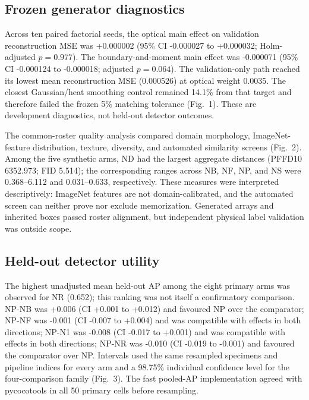 \subsection{Frozen generator diagnostics}
Across ten paired factorial seeds, the optical main effect on validation reconstruction MSE was +0.000002 (95\% CI -0.000027 to +0.000032; Holm-adjusted $p=0.977$). The boundary-and-moment main effect was -0.000071 (95\% CI -0.000124 to -0.000018; adjusted $p=0.064$). The validation-only path reached its lowest mean reconstruction MSE (0.000526) at optical weight 0.0035. The closest Gaussian/heat smoothing control remained 14.1\% from that target and therefore failed the frozen 5\% matching tolerance (Fig.~1). These are development diagnostics, not held-out detector outcomes.

The common-roster quality analysis compared domain morphology, ImageNet-feature distribution, texture, diversity, and automated similarity screens (Fig.~2). Among the five synthetic arms, ND had the largest aggregate distances (PFFD10 6352.973; FID 5.514); the corresponding ranges across NB, NF, NP, and NS were 0.368--6.112 and 0.031--0.633, respectively. These measures were interpreted descriptively: ImageNet features are not domain-calibrated, and the automated screen can neither prove nor exclude memorization. Generated arrays and inherited boxes passed roster alignment, but independent physical label validation was outside scope.

\subsection{Held-out detector utility}
The highest unadjusted mean held-out AP among the eight primary arms was observed for NR (0.652); this ranking was not itself a confirmatory comparison. NP-NB was +0.006 (CI +0.001 to +0.012) and favoured NP over the comparator; NP-NF was -0.001 (CI -0.007 to +0.004) and was compatible with effects in both directions; NP-N1 was -0.008 (CI -0.017 to +0.001) and was compatible with effects in both directions; NP-NR was -0.010 (CI -0.019 to -0.001) and favoured the comparator over NP. Intervals used the same resampled specimens and pipeline indices for every arm and a 98.75\% individual confidence level for the four-comparison family (Fig.~3). The fast pooled-AP implementation agreed with pycocotools in all 50 primary cells before resampling.

